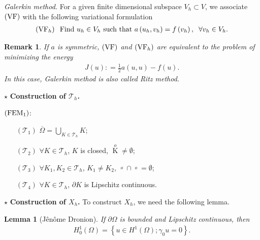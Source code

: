 \documentclass[11pt,a4paper,center,notitlepage]{article}
\numberwithin{equation}{section}
\newtheorem{lemma}{Lemma}[section]
\newtheorem{remark}{Remark}[section]
\begin{document}
\noindent
\textit{Galerkin method.} For a given finite dimensional subspace $V_h \subset V$, we associate $\left( {\rm VF}\right)$ with the following variational formulation
\begin{align}
\left( {{\rm VF}_h} \right) \hspace{2mm} \mbox{Find } {u_h} \in {V_h} \mbox{ such that } a\left( {{u_h},{v_h}} \right) = f\left( {{v_h}} \right), \hspace{2mm} \forall {v_h} \in {V_h}.
\end{align}

\begin{remark}
If $a$ is symmetric, $\left( {\rm VF}\right)$ and $\left( {\rm VF}_h \right)$ are equivalent to the problem of minimizing the energy
\begin{align}
J\left( u \right): = \frac{1}{2}a\left( {u,u} \right) - f\left( u \right) .
\end{align}
In this case, Galerkin method is also called Ritz method.
\end{remark}
\noindent
$\star$ \textbf{Construction of $\mathcal{T}_h$.} 

\noindent
$\left(\rm FEM_1\right)$:
\begin{itemize}
\item[$\left(\mathcal{T}_1\right)$] $\overline \Omega   = \bigcup\nolimits_{K \in {\mathcal{T}_h}} K $;
\item[$\left(\mathcal{T}_2\right)$] $\forall K\in \mathcal{T}_h$, $K$ is closed, $\mathop K\limits^ o   \ne \emptyset $;
\item[$\left(\mathcal{T}_3\right)$] $\forall K_1,K_2 \in \mathcal{T}_h$, $K_1\ne K_2$, $\mathop {{K_1}}\limits^o  \cap \mathop {{K_2}}\limits^o  = \emptyset $;
\item[$\left(\mathcal{T}_4\right)$] $\forall K\in \mathcal{T}_h$, $\partial K$ is Lipschitz continuous.
\end{itemize}
$\star$ \textbf{Construction of $X_h$.} To construct $X_h$, we need the following lemma.
\begin{lemma}[J\^en\^ome Dronion]\label{lemma1.5}
If $\partial \Omega$ is bounded and Lipschitz continuous, then 
\begin{align}
H_0^1\left( \Omega  \right) = \left\{ {u \in {H^1}\left( \Omega  \right);{\gamma _0}u = 0} \right\} .
\end{align}
\end{lemma}
\end{document}
